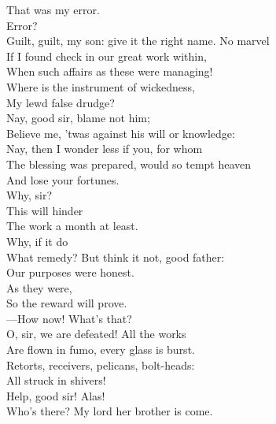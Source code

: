 \documentclass[a4paper,oneside,12pt]{memoir}
\begin{document}
\begin{drama*}
\mammonspeaks {} That was my error.\\
\subtlespeaks {} Error?\\
Guilt, guilt, my son: give it the right name. No marvel\\
If I found check in our great work within,\\
When such affairs as these were managing!\\
Where is the instrument of wickedness,\\
My lewd false drudge?\\
\mammonspeaks {} Nay, good sir, blame not him;\\
Believe me, 'twas against his will or knowledge:\\
\subtlespeaks Nay, then I wonder less if you, for whom\\
The blessing was prepared, would so tempt heaven\\
And lose your fortunes.\\
\mammonspeaks {} Why, sir?\\
\subtlespeaks {} This will hinder\\
The work a month at least.\\
\mammonspeaks {} Why, if it do\\
What remedy? But think it not, good father:\\
Our purposes were honest.\\
\subtlespeaks {} As they were,\\
So the reward will prove.\\
 ---How now! What's that?\\
\facespeaks O, sir, we are defeated! All the works\\
Are flown in fumo, every glass is burst.\\
Retorts, receivers, pelicans, bolt-heads:\\
All struck in shivers!\\
 Help, good sir! Alas!\\
Who's there? My lord her brother is come.\\

\end{drama*}
\end{document}
